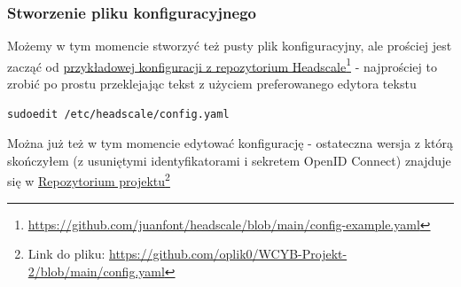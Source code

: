 \documentclass{report}
\numberwithin{equation}{section}
\begin{document}
\subsubsection{Stworzenie pliku konfiguracyjnego}

Możemy w tym momencie stworzyć też pusty plik konfiguracyjny, ale prościej jest zacząć od \linebreak
\href{https://github.com/juanfont/headscale/blob/main/config-example.yaml}{przykładowej konfiguracji z repozytorium Headscale}\footnote{\url{https://github.com/juanfont/headscale/blob/main/config-example.yaml}} - najprościej to zrobić po prostu przeklejając tekst z użyciem preferowanego edytora tekstu

\begin{verbatim}
sudoedit /etc/headscale/config.yaml
\end{verbatim}

Można już też w tym momencie edytować konfigurację - ostateczna wersja z którą skończyłem (z usuniętymi identyfikatorami i sekretem OpenID Connect) znajduje się w \href{https://github.com/oplik0/WCYB-Projekt-2/blob/main/config.yaml}{Repozytorium projektu}\footnote{Link do pliku: \url{https://github.com/oplik0/WCYB-Projekt-2/blob/main/config.yaml}}
\end{document}
